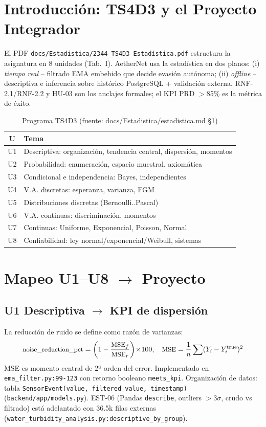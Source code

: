 \documentclass[conference]{IEEEtran}
\begin{document}
\section{Introducción: TS4D3 y el Proyecto Integrador}
El PDF \texttt{docs/Estadistica/2344\_TS4D3 Estadística.pdf} estructura la asignatura en 8 unidades (Tab.~I). AetherNet usa la estadística en dos planos: (i) \emph{tiempo real} -- filtrado EMA embebido que decide evasión autónoma; (ii) \emph{offline} -- descriptiva e inferencia sobre histórico PostgreSQL + validación externa. RNF-2.1/RNF-2.2 y HU-03 son los anclajes formales; el KPI PRD $>$85\% es la métrica de éxito.

\begin{table}[t]
\centering
\caption{Programa TS4D3 (fuente: docs/Estadistica/estadistica.md \S1)}
\label{tab:programa}
\begin{tabular}{@{}cl@{}}
\toprule
U & Tema \\
\midrule
U1 & Descriptiva: organización, tendencia central, dispersión, momentos \\
U2 & Probabilidad: enumeración, espacio muestral, axiomática \\
U3 & Condicional e independencia: Bayes, independientes \\
U4 & V.A. discretas: esperanza, varianza, FGM \\
U5 & Distribuciones discretas (Bernoulli..Pascal) \\
U6 & V.A. continuas: discriminación, momentos \\
U7 & Continuas: Uniforme, Exponencial, Poisson, Normal \\
U8 & Confiabilidad: ley normal/exponencial/Weibull, sistemas \\
\bottomrule
\end{tabular}
\end{table}

\section{Mapeo U1--U8 $\rightarrow$ Proyecto}
\subsection{U1 Descriptiva $\rightarrow$ KPI de dispersión}
La reducción de ruido se define como razón de varianzas:
\begin{equation}
\small
\text{noise\_reduction\_pct}= \left(1-\frac{\text{MSE}_f}{\text{MSE}_r}\right)\!\times\!100,\quad
\text{MSE}=\frac1n\sum (Y_i - Y^{\text{true}}_i)^2
\end{equation}
MSE es momento central de 2º orden del error. Implementado en \texttt{ema\_filter.py:99-123} con retorno booleano \texttt{meets\_kpi}. Organización de datos: tabla \texttt{SensorEvent(value, filtered\_value, timestamp)} (\texttt{backend/app/models.py}). EST-06 (Pandas \texttt{describe}, outliers $>$3$\sigma$, crudo vs filtrado) está adelantado con 36.5k filas externas (\texttt{water\_turbidity\_analysis.py:descriptive\_by\_group}).
\end{document}
